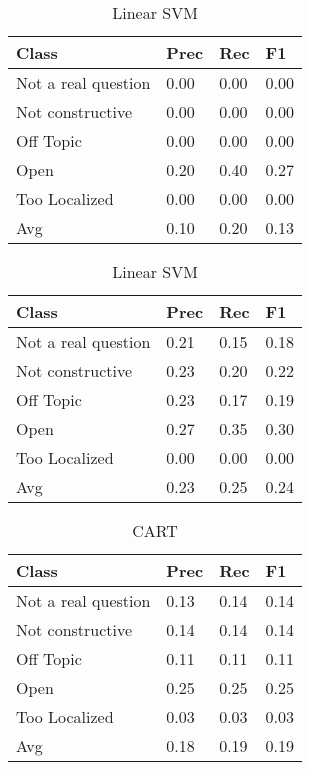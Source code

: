 \begin{table}[!htpb]
\centering
\begin{minipage}{.5\linewidth}
    \begin{tabular}{|l|l|l|l|} \hline
    \textbf{Class}& \textbf{Prec} & \textbf{Rec} & \textbf{F1} \\ \hline
    Not a real question & 0.00      & 0.00   & 0.00     \\
    Not constructive    & 0.00      & 0.00   & 0.00     \\
    Off Topic           & 0.00      & 0.00   & 0.00     \\
    Open                & 0.20      & 0.40   & 0.27     \\
    Too Localized       & 0.00      & 0.00   & 0.00     \\ \hline
    Avg                 & 0.10      & 0.20   & 0.13   \\ \hline  
    \end{tabular}
    \caption{Radial SVM}
    \label{tab3:rsvm}
\end{minipage}%
\begin{minipage}{.5\linewidth}
    \begin{tabular}{|l|l|l|l|} \hline
    \textbf{Class}& \textbf{Prec} & \textbf{Rec} & \textbf{F1} \\ \hline
    Not a real question & 0.21      & 0.15   & 0.18     \\
    Not constructive    & 0.23      & 0.20   & 0.22     \\
    Off Topic           & 0.23      & 0.17   & 0.19     \\
    Open                & 0.27      & 0.35   & 0.30     \\
    Too Localized       & 0.00      & 0.00   & 0.00     \\ \hline
    Avg                 & 0.23      & 0.25   & 0.24   \\ \hline  
    \end{tabular}
    \caption{Linear SVM}
    \label{tab3:lsvm}
\end{minipage}

\end{table}

\begin{table}[!htpb]
\centering
\begin{tabular}{|l|l|l|l|} \hline
\textbf{Class}& \textbf{Prec} & \textbf{Rec} & \textbf{F1} \\ \hline
Not a real question & 0.13      & 0.14   & 0.14     \\
Not constructive    & 0.14      & 0.14   & 0.14     \\
Off Topic           & 0.11      & 0.11   & 0.11     \\
Open                & 0.25      & 0.25   & 0.25     \\
Too Localized       & 0.03      & 0.03   & 0.03     \\ \hline
Avg                 & 0.18      & 0.19   & 0.19   \\ \hline  
\end{tabular}
\caption{CART}
\label{tab3:cart}
\end{table}

